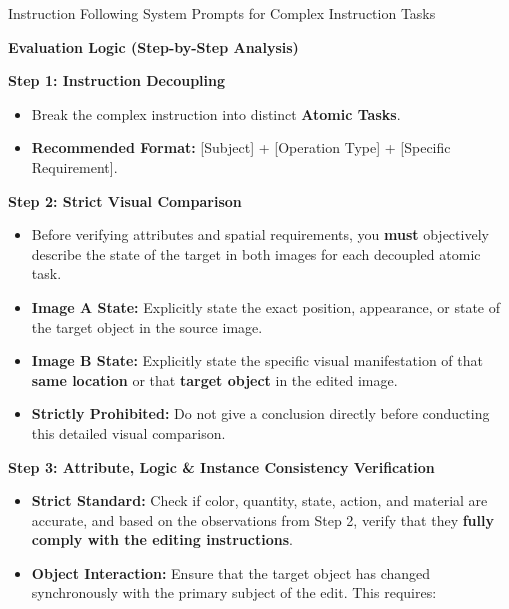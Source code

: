 \documentclass{llmxive}
\begin{document}
\begin{promptbox}[label={System Prompts: IF_Complex_Instruction}]{Instruction Following System Prompts for Complex Instruction Tasks}
\medskip

\textbf{Evaluation Logic (Step-by-Step Analysis)}

\medskip

\textbf{Step 1: Instruction Decoupling}

\begin{itemize}
    \item Break the complex instruction into distinct \textbf{Atomic Tasks}.
    
    \item \textbf{Recommended Format:} [Subject] + [Operation Type] + [Specific Requirement].
\end{itemize}

\medskip

\textbf{Step 2: Strict Visual Comparison}

\begin{itemize}[leftmargin=2.2em, labelsep=0.4em, itemsep=2pt]
    \item Before verifying attributes and spatial requirements, you \textbf{must} objectively describe the state of the target in both images for each decoupled atomic task.
    
    \item \textbf{Image A State:} Explicitly state the exact position, appearance, or state of the target object in the source image.
    
    \item \textbf{Image B State:} Explicitly state the specific visual manifestation of that \textbf{same location} or that \textbf{target object} in the edited image.
    
    \item \textbf{Strictly Prohibited:} Do not give a conclusion directly before conducting this detailed visual comparison.
\end{itemize}

\medskip

\textbf{Step 3: Attribute, Logic \& Instance Consistency Verification}

\begin{itemize}[leftmargin=2.2em, labelsep=0.4em, itemsep=2pt]
    \item \textbf{Strict Standard:} Check if color, quantity, state, action, and material are accurate, and based on the observations from Step 2, verify that they \textbf{fully comply with the editing instructions}.
    
    \item \textbf{Object Interaction:} Ensure that the target object has changed synchronously with the primary subject of the edit. This requires:
    

\end{itemize}
\end{promptbox}
\end{document}
